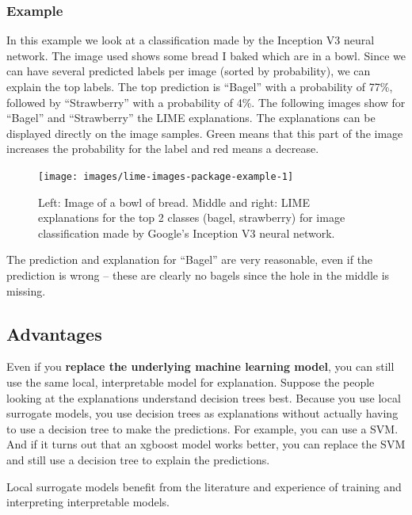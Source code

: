 \documentclass[
  11pt,
]{scrbook}
\begin{document}
\hypertarget{example-7}{%
\subsubsection{Example}\label{example-7}}

In this example we look at a classification made by the Inception V3 neural network.
The image used shows some bread I baked which are in a bowl.
Since we can have several predicted labels per image (sorted by probability), we can explain the top labels.
The top prediction is ``Bagel'' with a probability of 77\%, followed by ``Strawberry'' with a probability of 4\%.
The following images show for ``Bagel'' and ``Strawberry'' the LIME explanations.
The explanations can be displayed directly on the image samples.
Green means that this part of the image increases the probability for the label and red means a decrease.

\begin{figure}

{\centering \texttt{[image: images/lime-images-package-example-1]} 

}

\caption{Left: Image of a bowl of bread. Middle and right: LIME explanations for the top 2 classes (bagel, strawberry) for image classification made by Google's Inception V3 neural network.}\label{fig:lime-images-package-example-include}
\end{figure}

The prediction and explanation for ``Bagel'' are very reasonable, even if the prediction is wrong -- these are clearly no bagels since the hole in the middle is missing.

\hypertarget{advantages-13}{%
\subsection{Advantages}\label{advantages-13}}

Even if you \textbf{replace the underlying machine learning model}, you can still use the same local, interpretable model for explanation.
Suppose the people looking at the explanations understand decision trees best.
Because you use local surrogate models, you use decision trees as explanations without actually having to use a decision tree to make the predictions.
For example, you can use a SVM.
And if it turns out that an xgboost model works better, you can replace the SVM and still use a decision tree to explain the predictions.

Local surrogate models benefit from the literature and experience of training and interpreting interpretable models.
\end{document}
